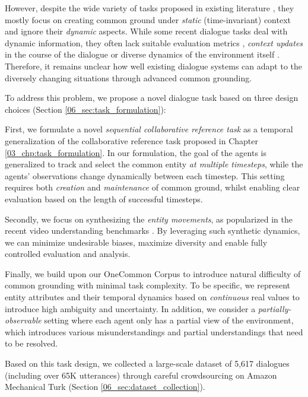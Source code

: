 However, despite the wide variety of tasks proposed in existing literature \citep{fang2015embodied,zarriess-etal-2016-pentoref,de2017guesswhat,udagawa2019natural,haber-etal-2019-photobook}, they mostly focus on creating common ground under \textit{static} (time-invariant) context and ignore their \textit{dynamic} aspects. While some recent dialogue tasks deal with dynamic information, they often lack suitable evaluation metrics \citep{pasunuru-bansal-2018-game}, \textit{context updates} in the course of the dialogue \citep{alamri2019audio} or diverse dynamics of the environment itself \citep{de2018talk,suhr-etal-2019-executing,narayan-chen-etal-2019-collaborative,thomason:corl19,moon-etal-2020-situated}. Therefore, it remains unclear how well existing dialogue systems can adapt to the diversely changing situations through advanced common grounding.

To address this problem, we propose a novel dialogue task based on three design choices (Section \ref{06_sec:task_formulation}):

First, we formulate a novel \textit{sequential collaborative reference task} as a temporal generalization of the collaborative reference task proposed in Chapter \ref{03_chp:task_formulation}. In our formulation, the goal of the agents is generalized to track and select the common entity \textit{at multiple timesteps}, while the agents' observations change dynamically between each timestep. This setting requires both \textit{creation} and \textit{maintenance} of common ground, whilst enabling clear evaluation based on the length of successful timesteps.

Secondly, we focus on synthesizing the \textit{entity movements}, as popularized in the recent video understanding benchmarks \citep{girdhar2020cater,yi2020clevrer,bakhtin2019phyre}. By leveraging such synthetic dynamics, we can minimize undesirable biases, maximize diversity and enable fully controlled evaluation and analysis.

Finally, we build upon our OneCommon Corpus to introduce natural difficulty of common grounding with minimal task complexity. To be specific, we represent entity attributes and their temporal dynamics based on \textit{continuous} real values to introduce high ambiguity and uncertainty. In addition, we consider a \textit{partially-observable} setting where each agent only has a partial view of the environment, which introduces various misunderstandings and partial understandings that need to be resolved.

Based on this task design, we collected a large-scale dataset of 5,617 dialogues (including over 65K utterances) through careful crowdsourcing on Amazon Mechanical Turk (Section \ref{06_sec:dataset_collection}).


